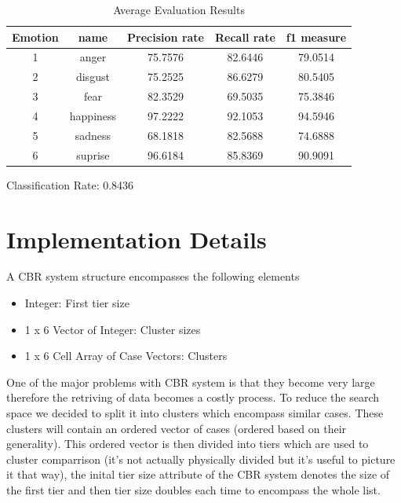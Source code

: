 \documentclass[11pt]{article}
\begin{document}
\begin{table}[H]
\caption{Average Evaluation Results} %
\centering %
\begin{tabular}{c c c c c} %
\hline\hline %
Emotion & name & Precision rate & Recall rate & f1 measure\\ [0.5ex] %
\hline %
1 & anger     & 75.7576 & 82.6446 & 79.0514\\ %
2 & disgust   & 75.2525 & 86.6279 & 80.5405\\
3 & fear      & 82.3529 & 69.5035 & 75.3846\\
4 & happiness & 97.2222 & 92.1053 & 94.5946\\
5 & sadness   & 68.1818 & 82.5688 & 74.6888\\ 
6 & suprise   & 96.6184 & 85.8369 & 90.9091\\ [1ex] %
\hline %
\end{tabular}
\label{table:sixevaluation} %
\end{table}

Classification Rate: 0.8436


\section{Implementation Details}

A CBR system structure encompasses the following elements 
\begin{itemize}
\item{Integer:                            First tier size}
\item{1 x 6 Vector of Integer:            Cluster sizes  }
\item{1 x 6 Cell Array of Case Vectors:   Clusters       }
\end{itemize}

One of the major problems with CBR system is that they become very large therefore the retriving of data becomes a costly process.
To reduce the search space we decided to split it into clusters which encompass similar cases. These clusters will contain an ordered vector of cases (ordered based on their generality). This ordered vector is then divided into tiers which are used to cluster comparrison (it's not actually physically divided but it's useful to picture it that way), the inital tier size attribute of the CBR system denotes the size of the first tier and then tier size doubles each time to encompass the whole list.
\end{document}
